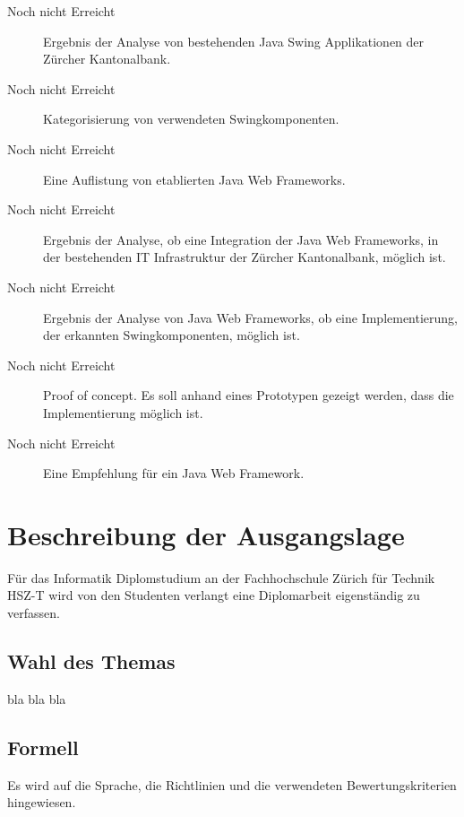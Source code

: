 \documentclass[abstracton, listof=totocnumbered,
bibliography=totocnumbered]{scrreprt}
\begin{document}
  \begin{description}
    \item [Noch nicht Erreicht] Ergebnis der Analyse von bestehenden Java Swing
    Applikationen der Zürcher Kantonalbank.
    \item [Noch nicht Erreicht] Kategorisierung von verwendeten
    Swingkomponenten.
    \item [Noch nicht Erreicht] Eine Auflistung von etablierten Java Web
    Frameworks.
    \item [Noch nicht Erreicht] Ergebnis der Analyse, ob eine Integration der
    Java Web Frameworks, in der bestehenden IT Infrastruktur der Zürcher
    Kantonalbank, möglich ist.
    \item [Noch nicht Erreicht] Ergebnis der Analyse von Java Web Frameworks, ob
    eine Implementierung, der erkannten Swingkomponenten, möglich ist.
    \item [Noch nicht Erreicht] Proof of concept. Es soll anhand eines
    Prototypen gezeigt werden, dass die Implementierung möglich ist.
    \item [Noch nicht Erreicht] Eine Empfehlung für ein Java Web Framework.
  \end{description}
  
  
  \chapter{Beschreibung der Ausgangslage}
  
  Für das Informatik Diplomstudium an der Fachhochschule Zürich für Technik
  HSZ-T wird von den Studenten verlangt eine Diplomarbeit eigenständig zu
  verfassen.
    
  \section{Wahl des Themas}
  
  bla bla bla
  
  \section{Formell}
  
  Es wird auf die Sprache, die Richtlinien und die verwendeten
  Bewertungskriterien hingewiesen.
  
\end{document}
